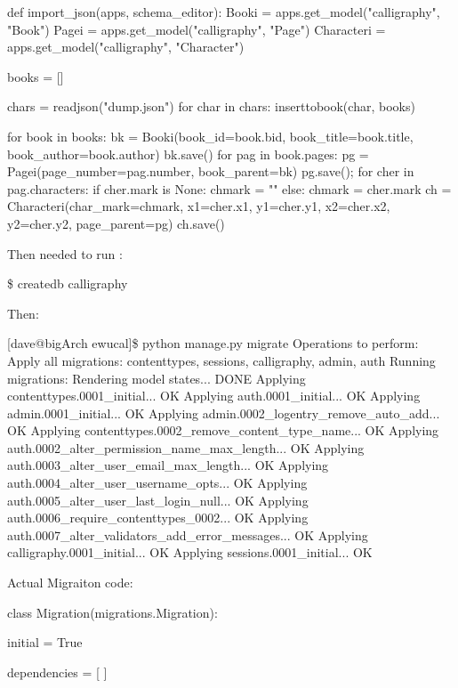 def import_json(apps, schema_editor):
    Booki = apps.get_model("calligraphy", "Book")
    Pagei = apps.get_model("calligraphy", "Page")
    Characteri = apps.get_model("calligraphy", "Character")

    books = []

    chars = readjson("dump.json")
    for char in chars:
        inserttobook(char, books)

    for book in books:
        bk = Booki(book_id=book.bid,
                  book_title=book.title,
                  book_author=book.author)
        bk.save()
        for pag in book.pages:
            pg = Pagei(page_number=pag.number,
                      book_parent=bk)
            pg.save();
            for cher in pag.characters:
                if cher.mark is None:
                    chmark = ""
                else:
                    chmark = cher.mark
                ch = Characteri(char_mark=chmark,
                               x1=cher.x1,
                               y1=cher.y1,
                               x2=cher.x2,
                               y2=cher.y2,
                               page_parent=pg)
                ch.save()
                
                
Then needed to run :

\$ createdb calligraphy

Then:

[dave@bigArch ewucal]\$ python manage.py migrate
Operations to perform:
  Apply all migrations: contenttypes, sessions, calligraphy, admin, auth
Running migrations:
  Rendering model states... DONE
  Applying contenttypes.0001_initial... OK
  Applying auth.0001_initial... OK
  Applying admin.0001_initial... OK
  Applying admin.0002_logentry_remove_auto_add... OK
  Applying contenttypes.0002_remove_content_type_name... OK
  Applying auth.0002_alter_permission_name_max_length... OK
  Applying auth.0003_alter_user_email_max_length... OK
  Applying auth.0004_alter_user_username_opts... OK
  Applying auth.0005_alter_user_last_login_null... OK
  Applying auth.0006_require_contenttypes_0002... OK
  Applying auth.0007_alter_validators_add_error_messages... OK
  Applying calligraphy.0001_initial... OK
  Applying sessions.0001_initial... OK

  
Actual Migraiton code:

class Migration(migrations.Migration):

    initial = True

    dependencies = [
    ]

